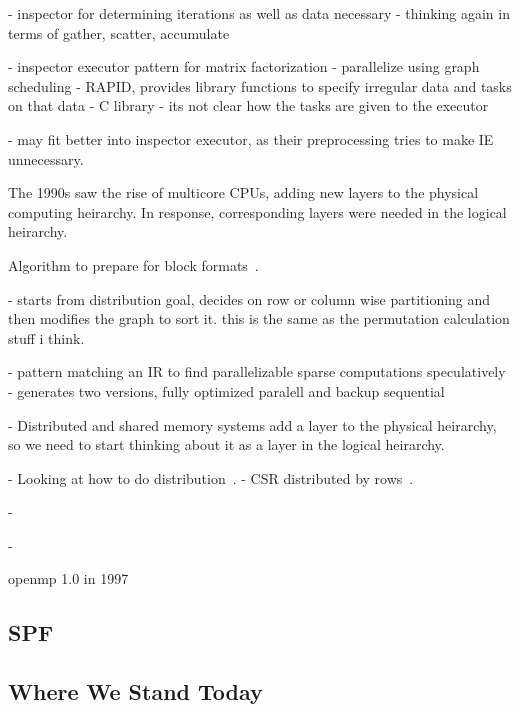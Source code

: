 \cite{das1994communication}
- inspector for determining iterations as well as data necessary
- thinking again in terms of gather, scatter, accumulate

\cite{fu1996run}
- inspector executor pattern for matrix factorization
- parallelize using graph scheduling
- RAPID, provides library functions to specify irregular data and tasks on that data
- C library
- its not clear how the tasks are given to the executor


\cite{ujaldon1996parallelization}
- may fit better into inspector executor, as their preprocessing tries to make IE unnecessary.


The 1990s saw the rise of multicore CPUs, adding new layers to the physical computing heirarchy. 
In response, corresponding layers were needed in the logical heirarchy.

Algorithm to prepare for block formats~\cite{pothen1990computing}.

\cite{catalyurek1999hypergraph}
- starts from distribution goal, decides on row or column wise partitioning and then modifies the graph to sort it. this is the same as the permutation calculation stuff i think.


\cite{kessler1999sparamat}
- pattern matching an IR to find parallelizable sparse computations speculatively
- generates two versions, fully optimized paralell and backup sequential


- Distributed and shared memory systems add a layer to the physical heirarchy, so we need to start thinking about it as a layer in the logical heirarchy. %

- Looking at how to do distribution~\cite{ogielski1993sparse}.
- CSR distributed by rows~\cite{erhel1995parallel}.

- 
\cite{filippone2000psblas}

- 

openmp 1.0 in 1997~\cite{dagum1998openmp}

\subsection{SPF}

\cite{strout2003compile}













\subsection{Where We Stand Today}





